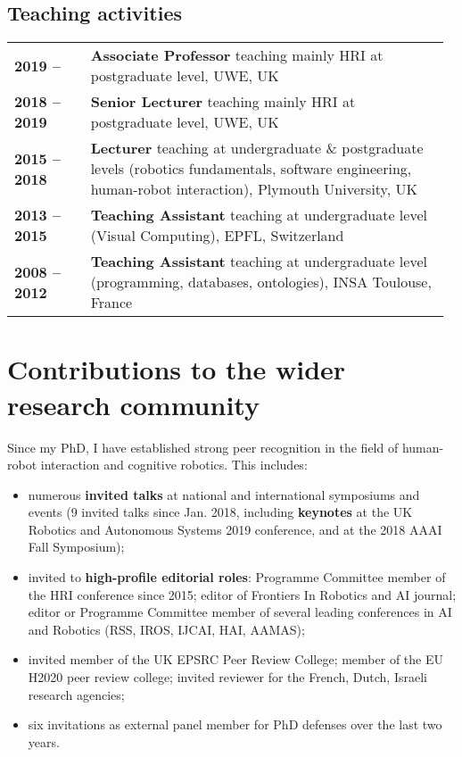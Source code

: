 \subsection{Teaching activities}

\begin{tabular}{p{0.17\linewidth}p{0.8\linewidth}}
    \bf 2019 --  & \textbf{Associate Professor} teaching mainly HRI at postgraduate level, UWE, UK \\
    \bf 2018 -- 2019 & \textbf{Senior Lecturer} teaching mainly HRI at postgraduate level, UWE, UK \\
    \bf 2015 -- 2018 & \textbf{Lecturer} teaching at undergraduate \&
    postgraduate levels (robotics fundamentals, software engineering, human-robot interaction), Plymouth University, UK \\
    \bf 2013 -- 2015 & \textbf{Teaching Assistant} teaching at undergraduate level (Visual Computing), EPFL, Switzerland \\
    \bf 2008 -- 2012 & \textbf{Teaching Assistant} teaching at undergraduate level (programming, databases, ontologies), INSA Toulouse, France \\
\end{tabular}

\vspace{2em}
\section{Contributions to the wider research community}

Since my PhD, I have established strong peer recognition in the field of human-robot interaction
and cognitive robotics. This includes:

\begin{itemize}[noitemsep,topsep=0pt,parsep=0pt,partopsep=0pt]
    \item numerous \textbf{invited talks} at national and international symposiums and
        events (9 invited talks since Jan. 2018, including \textbf{keynotes} at the UK Robotics
and Autonomous Systems 2019 conference, and at the 2018 AAAI Fall Symposium);
    \item invited to \textbf{high-profile editorial roles}: Programme Committee member of the HRI
conference since 2015; editor of Frontiers In Robotics and AI journal; editor or
Programme Committee member of several leading conferences in AI and Robotics
        (RSS, IROS, IJCAI, HAI, AAMAS);
    \item invited member of the UK EPSRC Peer Review College; member of the EU
        H2020 peer review college; invited reviewer for the French, Dutch, Israeli research agencies;
    \item six invitations as external panel member for PhD defenses over the last two years.
\end{itemize}


